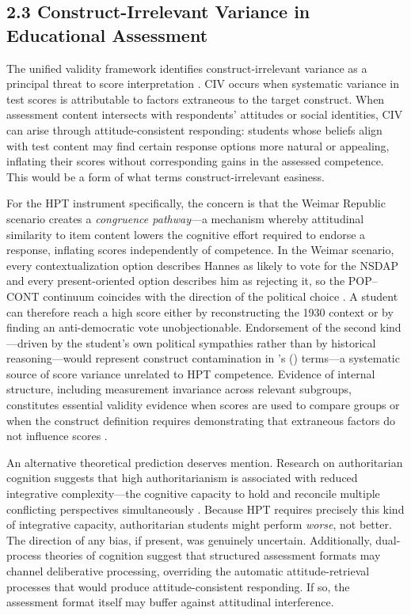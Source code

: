 \documentclass[PCJ,Unicode,screen,mode=plain]{cedram}
\begin{document}
\subsection*{2.3 Construct-Irrelevant Variance in Educational Assessment}\label{construct-irrelevant-variance-in-educational-assessment}

The unified validity framework identifies construct-irrelevant variance as a principal threat to score interpretation \citep{AERA2014Standards,Messick1995Validity}. CIV occurs when systematic variance in test scores is attributable to factors extraneous to the target construct. When assessment content intersects with respondents' attitudes or social identities, CIV can arise through attitude-consistent responding: students whose beliefs align with test content may find certain response options more natural or appealing, inflating their scores without corresponding gains in the assessed competence. This would be a form of what \citet{Messick1995Validity} terms construct-irrelevant easiness.

For the HPT instrument specifically, the concern is that the Weimar Republic scenario creates a \emph{congruence pathway}---a mechanism whereby attitudinal similarity to item content lowers the cognitive effort required to endorse a response, inflating scores independently of competence. In the Weimar scenario, every contextualization option describes Hannes as likely to vote for the NSDAP and every present-oriented option describes him as rejecting it, so the POP--CONT continuum coincides with the direction of the political choice \citep{Wilschut_Schiphorst2019One}. A student can therefore reach a high score either by reconstructing the 1930 context or by finding an anti-democratic vote unobjectionable. Endorsement of the second kind---driven by the student's own political sympathies rather than by historical reasoning---would represent construct contamination in \citeauthor{Messick1995Validity}'s (\citeyear{Messick1995Validity}) terms---a systematic source of score variance unrelated to HPT competence. Evidence of internal structure, including measurement invariance across relevant subgroups, constitutes essential validity evidence when scores are used to compare groups or when the construct definition requires demonstrating that extraneous factors do not influence scores \citep{AERA2014Standards}.

An alternative theoretical prediction deserves mention. Research on authoritarian cognition suggests that high authoritarianism is associated with reduced integrative complexity---the cognitive capacity to hold and reconcile multiple conflicting perspectives simultaneously \citep{Duckitt2001,Suedfeld1977}. Because HPT requires precisely this kind of integrative capacity, authoritarian students might perform \emph{worse}, not better. The direction of any bias, if present, was genuinely uncertain. Additionally, dual-process theories of cognition \citep{Evans2013} suggest that structured assessment formats may channel deliberative processing, overriding the automatic attitude-retrieval processes that would produce attitude-consistent responding. If so, the assessment format itself may buffer against attitudinal interference.
\end{document}
